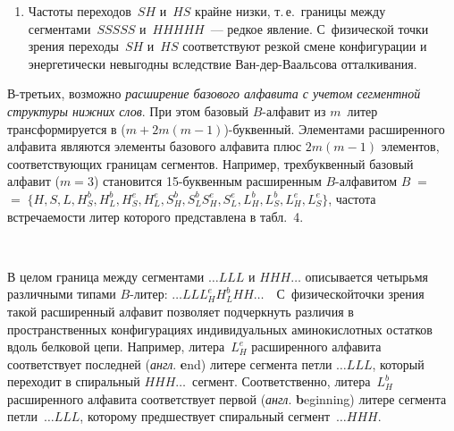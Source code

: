 \begin{multicols}{2}
\addtocounter{table}{1}

\begin{enumerate}[4.]\item Частоты переходов~$SH$ и~$HS$ крайне низки, т.\,е.\ границы 
между сегментами~$SSSSS$  и~$HHHHH$~--- редкое явление. 
С~физической точки зрения переходы~$SH$ и~$HS$ соответствуют 
резкой смене конфигурации и энергетически невыгодны вследствие 
Ван-дер-Вааль\-со\-ва отталкивания.
    \end{enumerate}

В-третьих, возможно \textit{расширение базового алфавита с учетом 
сегментной структуры нижних слов}. При этом базовый $B$-ал\-фа\-вит из 
$m$~литер трансформируется в ($m + 2m(m-1)$)-бук\-вен\-ный. Элементами 
расширенного алфавита являются элементы базового алфавита плюс $2m(m - 
1)$ элементов, соответствующих границам сегментов. Например, 
трехбуквенный базовый алфавит ($m = 3$) становится 15-бук\-вен\-ным 
расширенным $B$-ал\-фа\-ви\-том $B\;=$\linebreak $=\;\{ H,S,L,H_S^b, H_L^b, H_S^e,H_L^e, 
S_H^b,S_L^bS_H^e,S_L^e,L_H^b,L_S^b,$\linebreak $L_H^e,L_S^e\}$, частота встречаемости 
литер которого представлена в табл.~4.

    \begin{figure*}[b] %
    \vspace*{1pt}
\begin{center}
\mbox{%
\epsfxsize=116.717mm
}
\end{center}
\vspace*{-9pt}
\end{figure*}


    В целом граница между сегментами $\ldots LLL$ и $HHH\ldots$ 
описывается четырьмя различными типами $B$-ли\-тер: $\ldots 
LLL_H^eH_L^bHH\ldots$\ \ С~физической\linebreak точки зрения такой расширенный 
алфавит позволяет подчеркнуть различия в пространственных конфигурациях 
индивидуальных аминокислотных остатков вдоль белковой цепи. Например, 
литера~$L_H^e$ расширенного алфавита соответствует последней 
(\textit{англ}. \textbf{e}nd) литере сегмента петли $\ldots LLL$, который 
переходит в спиральный $HHH\ldots$\ сегмент. Соответственно, 
литера~$L_H^b$ расширенного алфавита соответствует первой (\textit{англ}. 
\textbf{b}eginning) литере сегмента петли~$\ldots LLL$, которому предшествует 
спиральный сег\-мент~$\ldots HHH$.


\end{multicols}
